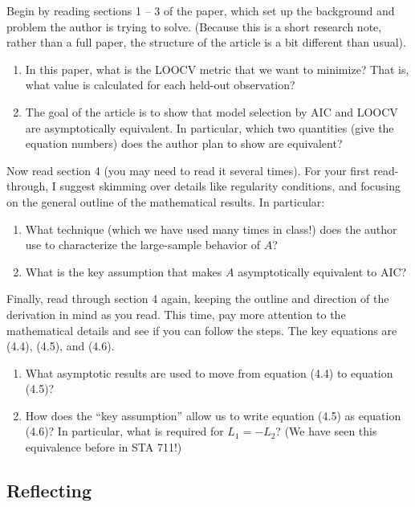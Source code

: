 \documentclass[11pt]{article}
\begin{document}
\noindent Begin by reading sections 1 -- 3 of the paper, which set up the background and problem the author is trying to solve. (Because this is a short research note, rather than a full paper, the structure of the article is a bit different than usual).

\begin{enumerate}
\item In this paper, what is the LOOCV metric that we want to minimize? That is, what value is calculated for each held-out observation?

\item The goal of the article is to show that model selection by AIC and LOOCV are asymptotically equivalent. In particular, which two quantities (give the equation numbers) does the author plan to show are equivalent?
\end{enumerate}

\noindent Now read section 4 (you may need to read it several times). For your first read-through, I suggest skimming over details like regularity conditions, and focusing on the general outline of the mathematical results. In particular:

\begin{enumerate}
\item What technique (which we have used many times in class!) does the author use to characterize the large-sample behavior of $A$?

\item What is the key assumption that makes $A$ asymptotically equivalent to AIC?
\end{enumerate}

\noindent Finally, read through section 4 again, keeping the outline and direction of the derivation in mind as you read. This time, pay more attention to the mathematical details and see if you can follow the steps. The key equations are (4.4), (4.5), and (4.6).

\begin{enumerate}
\item What asymptotic results are used to move from equation (4.4) to equation (4.5)?

\item How does the ``key assumption'' allow us to write equation (4.5) as equation (4.6)? In particular, what is required for $L_1 = -L_2$? (We have seen this equivalence before in STA 711!)
\end{enumerate}

\subsection*{Reflecting}
\end{document}
